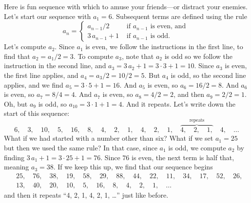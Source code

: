 Here is fun sequence with which to amuse your friends---or distract
your enemies.  Let's start our sequence with $a_1 = 6$.  Subsequent
terms are defined using the rule
$$
a_n = \begin{cases} a_{n-1} / 2 & \mbox{ if $a_{n-1}$ is even, and } \\
3 \, a_{n-1} + 1 & \mbox{ if $a_{n-1}$ is odd.}
\end{cases}
$$
Let's compute $a_2$.  Since $a_1$ is even, we follow the instructions
in the first line, to find that $a_2 = a_1/2 = 3$. To compute $a_3$,
note that $a_2$ is odd so we follow the instruction in the second
line, and $a_3 = 3 \, a_2 + 1 = 3 \cdot 3 + 1 = 10$.  Since $a_3$ is
even, the first line applies, and $a_4 = a_3 / 2 = 10 / 2 = 5$.  But
$a_4$ is odd, so the second line applies, and we find $a_5 = 3 \cdot 5
+ 1 = 16$.  And $a_5$ is even, so $a_6 = 16 / 2 = 8$.  And $a_6$ is
even, so $a_7 = 8/4 = 4$.  And $a_7$ is even, so $a_8 = 4 / 2 = 2$,
and then $a_9 = 2/2 = 1$.  Oh, but $a_9$ is odd, so $a_{10} = 3 \cdot
1 + 1 = 4$.  And it repeats.  Let's write down the start of this sequence:
$$
6,\quad %
3,\quad %
10,\quad  %
5,\quad  %
16,\quad  %
8,\quad  %
4,\quad  %
2,\quad  %
1,\quad  %
4,\quad %
2,\quad %
1,\quad %
\overbrace{4,\quad %
2,\quad %
1,}^{\mbox{repeats}}\quad %
4,\quad %
\ldots
$$
What if we had started with a number other than six?  What if we set
$a_1 = 25$ but then we used the same rule?  In that case, since $a_1$
is odd, we compute $a_2$ by finding $3 \, a_1 + 1 = 3 \cdot 25 + 1 =
76$.  Since $76$ is even, the next term is half that, meaning $a_3 =
38$.  If we keep this up, we find that our sequence begins
\begin{align*}
&25,\quad 76,\quad 38,\quad 19,\quad 58,\quad 29,\quad 88,\quad 44,\quad 22,\quad 11,\quad 34,\quad 17,\quad 52,\quad 26, \\
&13,\quad 40,\quad 20,\quad 10,\quad 5,\quad 16,\quad 8,\quad 4,\quad 2, \quad 1, \quad \ldots
\end{align*}
and then it repeats ``4, 2, 1, 4, 2, 1, \ldots'' just like before.


